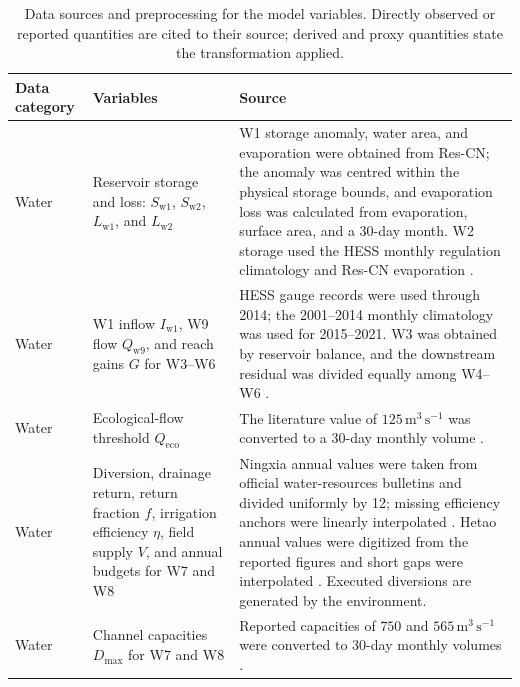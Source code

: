 \documentclass [a4paper,fleqn] {cas-dc}
\begin{document}
\begin{table}[pos=t]
\caption{Data sources and preprocessing for the model variables. Directly observed or reported quantities are cited to their source; derived and proxy quantities state the transformation applied.}
\label{tab:data-sources}
\centering
\footnotesize
\renewcommand{\arraystretch}{1.00}
\begin{tabularx}{\textwidth}{@{}>{\raggedright\arraybackslash}p{}
  >{\raggedright\arraybackslash}p{}
  >{\raggedright\arraybackslash}X@{}}
\toprule
Data category & Variables & Source \\
\midrule
Water & Reservoir storage and loss: $S_{\mathrm{w1}}$, $S_{\mathrm{w2}}$,
$L_{\mathrm{w1}}$, and $L_{\mathrm{w2}}$ & W1 storage anomaly, water area,
and evaporation were obtained from Res-CN; the anomaly was centred within the
physical storage bounds, and evaporation loss was calculated from evaporation,
surface area, and a 30-day month. W2 storage used the HESS monthly regulation
climatology and Res-CN evaporation
\citep{Shen2023ResCN,Shen2022ResCNDataset,Yin2021YellowRiver,Yin2020YellowRiverDataset}. \\

Water & W1 inflow $I_{\mathrm{w1}}$, W9 flow $Q_{\mathrm{w9}}$, and reach gains
$G$ for W3--W6 & HESS gauge records were used through 2014; the 2001--2014
monthly climatology was used for 2015--2021. W3 was obtained by reservoir
balance, and the downstream residual was divided equally among W4--W6
\citep{Yin2021YellowRiver,Yin2020YellowRiverDataset,NingxiaWaterBulletins,Feng2025Hetao}. \\

Water & Ecological-flow threshold $Q_{\mathrm{eco}}$ & The literature value of
$125\,\mathrm{m^3\,s^{-1}}$ was converted to a 30-day monthly volume
\citep{Lu2021EcologicalFlow}. \\

Water & Diversion, drainage return, return fraction $f$, irrigation efficiency
$\eta$, field supply $V$, and annual budgets for W7 and W8 & Ningxia annual
values were taken from official water-resources bulletins and divided uniformly
by 12; missing efficiency anchors were linearly interpolated
\citep{NingxiaWaterBulletins,Meng2015NingxiaIrrigation}. Hetao annual values were
digitized from the reported figures and short gaps were interpolated
\citep{Feng2025Hetao}. Executed diversions are generated by the environment. \\

Water & Channel capacities $D_{\max}$ for W7 and W8 & Reported capacities of
$750$ and $565\,\mathrm{m^3\,s^{-1}}$ were converted to 30-day monthly volumes
\citep{NingxiaCanals2017,Liao2022CanalScheduling}. \\


\end{tabularx}
\end{table}
\end{document}
